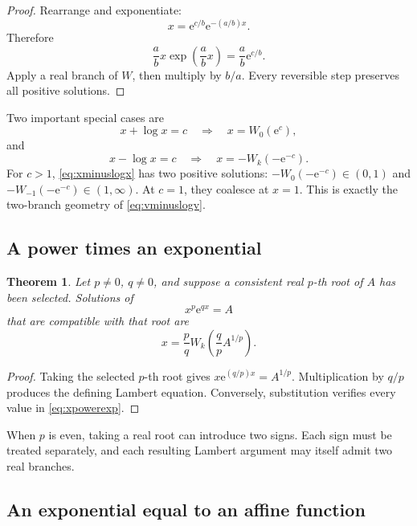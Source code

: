 \documentclass[11pt]{article}
\newtheorem{theorem}{Theorem}[section]
\theoremstyle{remark}
\newcommand{\ee}{\mathrm e}
\begin{document}
\begin{proof}
Rearrange and exponentiate:
\[
       x=\ee^{c/b}\ee^{-(a/b)x}.
\]
Therefore
\[
       \frac abx\exp\left(\frac abx\right)
       =\frac ab\ee^{c/b}.
\]
Apply a real branch of \(W\), then multiply by \(b/a\).
Every reversible step preserves all positive solutions.
\end{proof}

Two important special cases are
\[
       x+\log x=c
       \quad\Longrightarrow\quad
       x=W_0(\ee^c),
\]
and
\begin{equation}\label{eq:xminuslogx}
       x-\log x=c
       \quad\Longrightarrow\quad
       x=-W_k(-\ee^{-c}).
\end{equation}
For \(c>1\), \eqref{eq:xminuslogx} has two positive solutions:
\(-W_0(-\ee^{-c})\in(0,1)\) and
\(-W_{-1}(-\ee^{-c})\in(1,\infty)\).  At \(c=1\), they coalesce at
\(x=1\).  This is exactly the two-branch geometry of
\cref{eq:vminuslogv}.

\subsection{A power times an exponential}

\begin{theorem}\label{thm:xpowerexp}
Let \(p\neq0\), \(q\neq0\), and suppose a consistent real \(p\)-th root of
\(A\) has been selected.  Solutions of
\[
       x^p\ee^{qx}=A
\]
that are compatible with that root are
\begin{equation}\label{eq:xpowerexp}
       x=\frac pq
       W_k\left(\frac qp A^{1/p}\right).
\end{equation}
\end{theorem}

\begin{proof}
Taking the selected \(p\)-th root gives
\(x\ee^{(q/p)x}=A^{1/p}\).  Multiplication by \(q/p\) produces the defining
Lambert equation.  Conversely, substitution verifies every value in
\eqref{eq:xpowerexp}.
\end{proof}

When \(p\) is even, taking a real root can introduce two signs.  Each sign
must be treated separately, and each resulting Lambert argument may itself
admit two real branches.

\subsection{An exponential equal to an affine function}
\end{document}
